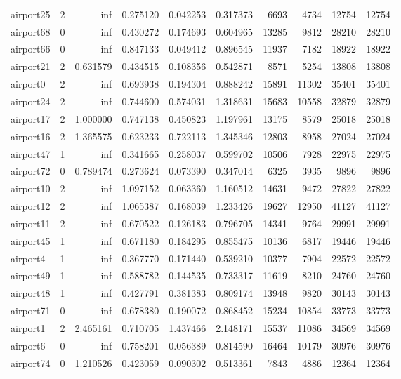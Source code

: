 \begin{longtable}{|l|r|r|r|r|r|r|r|r|r|}
airport25 & 2 & inf & 0.275120 & 0.042253 & 0.317373 & 6693 & 4734 & 12754 & 12754 \\
airport68 & 0 & inf & 0.430272 & 0.174693 & 0.604965 & 13285 & 9812 & 28210 & 28210 \\
airport66 & 0 & inf & 0.847133 & 0.049412 & 0.896545 & 11937 & 7182 & 18922 & 18922 \\
airport21 & 2 & 0.631579 & 0.434515 & 0.108356 & 0.542871 & 8571 & 5254 & 13808 & 13808 \\
airport0 & 2 & inf & 0.693938 & 0.194304 & 0.888242 & 15891 & 11302 & 35401 & 35401 \\
airport24 & 2 & inf & 0.744600 & 0.574031 & 1.318631 & 15683 & 10558 & 32879 & 32879 \\
airport17 & 2 & 1.000000 & 0.747138 & 0.450823 & 1.197961 & 13175 & 8579 & 25018 & 25018 \\
airport16 & 2 & 1.365575 & 0.623233 & 0.722113 & 1.345346 & 12803 & 8958 & 27024 & 27024 \\
airport47 & 1 & inf & 0.341665 & 0.258037 & 0.599702 & 10506 & 7928 & 22975 & 22975 \\
airport72 & 0 & 0.789474 & 0.273624 & 0.073390 & 0.347014 & 6325 & 3935 & 9896 & 9896 \\
airport10 & 2 & inf & 1.097152 & 0.063360 & 1.160512 & 14631 & 9472 & 27822 & 27822 \\
airport12 & 2 & inf & 1.065387 & 0.168039 & 1.233426 & 19627 & 12950 & 41127 & 41127 \\
airport11 & 2 & inf & 0.670522 & 0.126183 & 0.796705 & 14341 & 9764 & 29991 & 29991 \\
airport45 & 1 & inf & 0.671180 & 0.184295 & 0.855475 & 10136 & 6817 & 19446 & 19446 \\
airport4 & 1 & inf & 0.367770 & 0.171440 & 0.539210 & 10377 & 7904 & 22572 & 22572 \\
airport49 & 1 & inf & 0.588782 & 0.144535 & 0.733317 & 11619 & 8210 & 24760 & 24760 \\
airport48 & 1 & inf & 0.427791 & 0.381383 & 0.809174 & 13948 & 9820 & 30143 & 30143 \\
airport71 & 0 & inf & 0.678380 & 0.190072 & 0.868452 & 15234 & 10854 & 33773 & 33773 \\
airport1 & 2 & 2.465161 & 0.710705 & 1.437466 & 2.148171 & 15537 & 11086 & 34569 & 34569 \\
airport6 & 0 & inf & 0.758201 & 0.056389 & 0.814590 & 16464 & 10179 & 30976 & 30976 \\
airport74 & 0 & 1.210526 & 0.423059 & 0.090302 & 0.513361 & 7843 & 4886 & 12364 & 12364 \\

\end{longtable}
